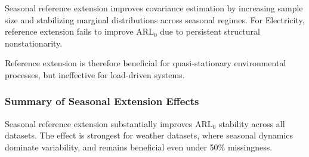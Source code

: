Seasonal reference extension improves covariance estimation by increasing sample size and stabilizing marginal distributions across seasonal regimes.
For Electricity, reference extension fails to improve \ac{ARL}$_0$ due to persistent structural nonstationarity.

Reference extension is therefore beneficial for quasi-stationary environmental processes, but ineffective for load-driven systems.


\begin{table}[htbp]
\centering
\caption{ARL$_0$ performance with standard deviation under missingness relative to baseline with extended reference timeframe}
\label{tab:arl0_missing_ext}
\end{table}

\subsubsection{Summary of Seasonal Extension Effects}

Seasonal reference extension substantially improves \ac{ARL}$_0$ stability across all datasets. The effect is strongest for weather datasets, where seasonal dynamics dominate variability, and remains beneficial even under 50\% missingness.

